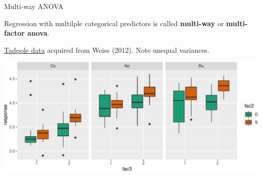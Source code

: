 \documentclass[
  ignorenonframetext,
]{beamer}
\newenvironment{Shaded}{\begin{snugshade}}{\end{snugshade}}
\newcommand{\CommentTok}[1]{\textcolor[rgb]{0.56,0.35,0.01}{\textit{#1}}}
\newcommand{\DataTypeTok}[1]{\textcolor[rgb]{0.13,0.29,0.53}{#1}}
\newcommand{\KeywordTok}[1]{\textcolor[rgb]{0.13,0.29,0.53}{\textbf{#1}}}
\newcommand{\NormalTok}[1]{#1}
\newcommand{\OperatorTok}[1]{\textcolor[rgb]{0.81,0.36,0.00}{\textbf{#1}}}
\newcommand{\StringTok}[1]{\textcolor[rgb]{0.31,0.60,0.02}{#1}}
\begin{document}
\begin{frame}[fragile]{Multi-way ANOVA}
\protect\hypertarget{multi-way-anova}{}

Regression with multilple categorical predictors is called
\textbf{multi-way} or \textbf{multi-factor anova}.

\href{https://sakai.unc.edu/access/content/group/3d1eb92e-7848-4f55-90c3-7c72a54e7e43/public/docs/lectures/lecture2.htm\#description}{Tadpole
data} acquired from Weiss (2012). Note unequal variances. \scriptsize

\begin{Shaded}
\end{Shaded}

\includegraphics{Regression_and_ANOVA_files/figure-beamer/unnamed-chunk-12-1.pdf}

\end{frame}
\end{document}
